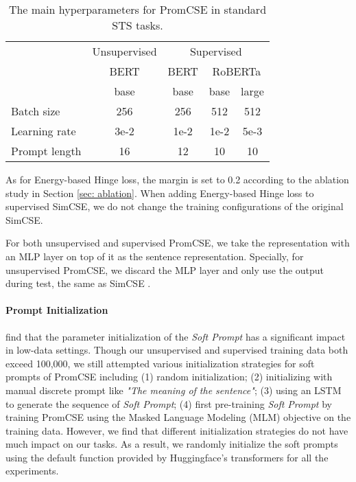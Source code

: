 \documentclass[11pt]{article}
\begin{document}
\begin{table}[!h]
\small
\centering
\begin{tabular}{lcccc}
\toprule
 & Unsupervised & \multicolumn{3}{c}{Supervised}                         \\
 & BERT         & BERT & \multicolumn{2}{c}{RoBERTa} \\
 & base         & base & base         & large \\
\midrule
Batch size    & 256         & 256        & 512           & 512          \\
Learning rate & 3e-2        & 1e-2       & 1e-2         & 5e-3         \\
Prompt length & 16        & 12       & 10         & 10         \\
 \bottomrule
\end{tabular}
\caption{\label{tab: param}
The main hyperparameters for PromCSE in standard STS tasks.}
\end{table}

As for Energy-based Hinge loss, the margin  is set to 0.2 according to the ablation study in Section \ref{sec: ablation}. When adding Energy-based Hinge loss to supervised SimCSE, we do not change the training configurations of the original SimCSE.

For both unsupervised and supervised PromCSE, we take the  representation with an MLP layer on top of it as the sentence representation. Specially, for unsupervised PromCSE, we discard the MLP layer and only use the  output during test, the same as SimCSE \cite{gao2021simcse}.

\paragraph{Prompt Initialization}
\cite{li2021prefix} find that the parameter initialization of the \textit{Soft Prompt} has a significant impact in low-data settings. 
Though our unsupervised and supervised training data both exceed 100,000, we still attempted various initialization strategies for soft prompts of PromCSE including (1) random initialization; (2) initializing with manual discrete prompt like \textit{"The meaning of the sentence"}; (3) using an LSTM to generate the sequence of \textit{Soft Prompt}; (4) first pre-training \textit{Soft Prompt} by training PromCSE using the Masked Language Modeling (MLM) objective on the training data. However, we find that different initialization strategies do not have much impact on our tasks. As a result, we randomly initialize the soft prompts using the default  function provided by Huggingface’s transformers \cite{huggingface} for all the experiments.
\end{document}
